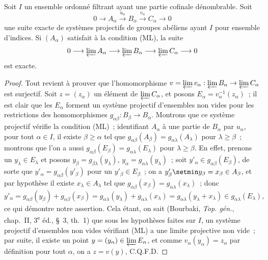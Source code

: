 \begin{proposition}[13.2.2]
\label{0.13.2.2-fr}
Soit $I$ un ensemble ordonné filtrant ayant une partie cofinale
\textup{dénombrable.} Soit
\[
0\longrightarrow A_\alpha\xrightarrow{u_\alpha}B_\alpha
\xrightarrow{v_\alpha}C_\alpha\longrightarrow0
\]
une suite exacte de systèmes projectifs de groupes abéliens ayant
$I$ pour ensemble d'indices. Si $(A_\alpha)$ satisfait à la condition
\textup{(ML)}, la suite
\[
0\longrightarrow\varprojlim A_\alpha
\longrightarrow\varprojlim B_\alpha
\longrightarrow\varprojlim C_\alpha\longrightarrow0
\]
est exacte.
\end{proposition}

\begin{proof}
Tout revient à prouver que l'homomorphisme
$v=\varprojlim v_\alpha:\varprojlim B_\alpha\to\varprojlim C_\alpha$
est surjectif. Soit $z=(z_\alpha)$ un élément de
$\varprojlim C_\alpha$, et posons
$E_\alpha=v_\alpha^{-1}(z_\alpha)$~; il est clair que les $E_\alpha$
forment un système projectif d'ensembles non vides pour les restrictions
des homomorphismes $g_{\alpha\beta}:B_\beta\to B_\alpha$. Montrons que ce
système projectif vérifie la condition (ML)~; identifiant $A_\alpha$ à une
partie de $B_\alpha$ par $u_\alpha$, pour tout $\alpha\in I$, il existe
$\beta\geq\alpha$ tel que
$g_{\alpha\beta}(A_\beta)=g_{\alpha\lambda}(A_\lambda)$ pour
$\lambda\geq\beta$~; montrons que l'on a aussi
$g_{\alpha\beta}(E_\beta)=g_{\alpha\lambda}(E_\lambda)$ pour
$\lambda\geq\beta$. En effet, prenons un $y_\lambda\in E_\lambda$ et
posons $y_\beta=g_{\beta\lambda}(y_\lambda)$,
$y_\alpha=g_{\alpha\lambda}(y_\lambda)$~; soit
$y'_\alpha\in g_{\alpha\beta}(E_\beta)$, de sorte que
$y'_\alpha=g_{\alpha\beta}(y'_\beta)$ pour un $y'_\beta\in E_\beta$~;
on a $y'_\beta\setmin y_\beta=x_\beta\in A_\beta$, et par hypothèse il existe
$x_\lambda\in A_\lambda$ tel que
$g_{\alpha\beta}(x_\beta)=g_{\alpha\lambda}(x_\lambda)$~; donc
\[
y'_\alpha=g_{\alpha\beta}(y_\beta)+g_{\alpha\beta}(x_\beta)
=g_{\alpha\lambda}(y_\lambda)+g_{\alpha\lambda}(x_\lambda)
=g_{\alpha\lambda}(y_\lambda+x_\lambda)
\in g_{\alpha\lambda}(E_\lambda),
\]
ce qui démontre notre assertion. Cela étant, on sait (Bourbaki,
\emph{Top. gén.}, chap.~II, 3\textsuperscript{e} éd., §~3, th.~1) que sous
les hypothèses faites sur $I$, un système projectif d'ensembles non vides
vérifiant (ML) a une limite projective non vide~; par suite, il existe un
point $y=(y_\alpha)\in\varprojlim E_\alpha$, et comme
$v_\alpha(y_\alpha)=z_\alpha$ par définition pour tout $\alpha$, on a
$z=v(y)$, C.Q.F.D.
\end{proof}

